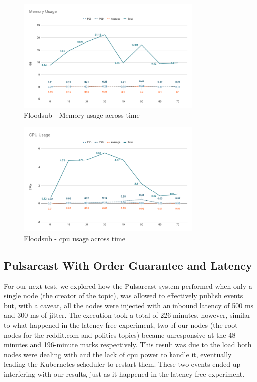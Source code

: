 \begin{figure}[!htb]
  \centering
  \includegraphics[width=0.8\textwidth]{img/graph-floodsub-memory.png}
  \caption{Floodsub - Memory usage across time}
  \label{fig:graph-floodsub-memory}
\end{figure}

\begin{figure}[!htb]
  \centering
  \includegraphics[width=0.8\textwidth]{img/graph-floodsub-cpu.png}
  \caption{Floodsub - \acrshort{cpu} usage across time}
  \label{fig:graph-floodsub-cpu}
\end{figure}

\subsection{Pulsarcast With Order Guarantee and Latency}\label{subsec:pulsarcast-with-order-guarantee-and-latency}

For our next test, we explored how the Pulsarcast system performed when only a
single node (the creator of the topic), was allowed to effectively publish
events but, with a caveat, all the nodes were injected with an inbound latency
of 500 ms and 300 ms of jitter. The execution took a total of 226 minutes,
however, similar to what happened in the latency-free experiment, two of our
nodes (the root nodes for the reddit.com and politics topics) became
unresponsive at the 48 minutes and 196-minute marks respectively. This result
was due to the load both nodes were dealing with and the lack of \acrshort{cpu} power to
handle it, eventually leading the Kubernetes scheduler to restart them. These
two events ended up interfering with our results, just as it happened in the
latency-free experiment.

